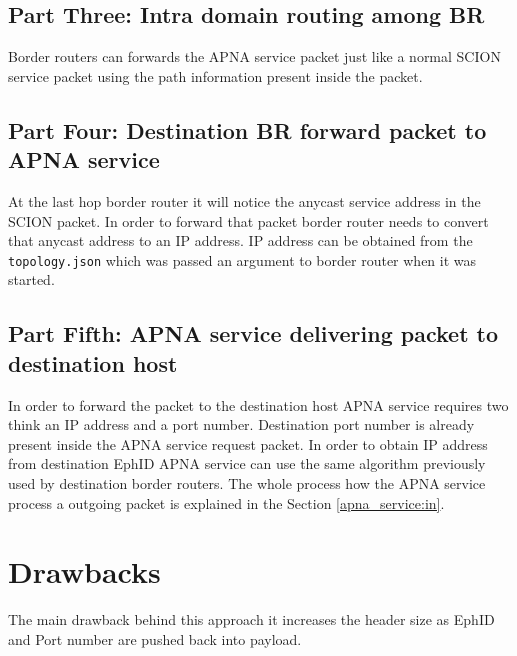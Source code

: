 \subsection{Part Three: Intra domain routing among BR}
Border routers can forwards the APNA service packet just like a normal SCION service packet using the path information present inside the packet.

\subsection{Part Four: Destination BR forward packet to APNA service}
At the last hop border router it will notice the anycast service address in the SCION packet. In order to forward that packet border router needs to convert that anycast address to an IP address. IP address can be obtained from the \texttt{topology.json} which was passed an argument to border router when it was started.

\subsection{Part Fifth: APNA service delivering packet to destination host}
In order to forward the packet to the destination host APNA service requires two think an IP address and a port number. Destination port number is already present inside the APNA service request packet. In order to obtain IP address from destination EphID APNA service can use the same algorithm previously used by destination border routers. The whole process how the APNA service process a outgoing packet is explained in the Section \ref{apna_service:in}.

\section{Drawbacks}
The main drawback behind this approach it increases the header size as EphID and Port number are pushed back into payload. 